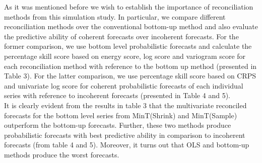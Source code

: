 \documentclass[a4paper, 11pt]{article}
\begin{document}
\noindent
As it was mentioned before we wish to establish the importance of reconciliation methods from this simulation study. In particular, we compare different reconciliation methods over the conventional bottom-up method and also evaluate the predictive ability of coherent forecasts over incoherent forecasts. For the former comparison, we use bottom level probabilistic forecasts and calculate the percentage skill score based on energy score, log score and variogram score for each reconciliation method with reference to the bottom up method (presented in Table 3). For the latter comparison, we use percentage skill score based on CRPS and univariate log score for coherent probabilistic forecasts of each individual series with reference to incoherent forecasts (presented in Table 4 and 5).\\

\noindent
It is clearly evident from the results in table 3 that the multivariate reconciled forecasts for the bottom level series from MinT(Shrink) and MinT(Sample) outperform the bottom-up forecasts. Further, these two methods produce probabilistic forecasts with best predictive ability in comparison to incoherent forecasts (from table 4 and 5). Moreover, it turns out that OLS and bottom-up methods produce the worst forecasts. 
\end{document}
